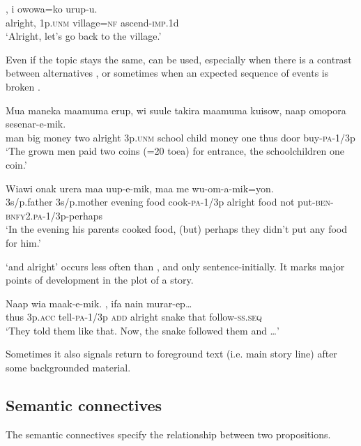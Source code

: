 \ea%
\label{ex:3:x720}
\gll {}, i owowa=ko urup-u. \\
alright, 1p.\textsc{unm} village=\textsc{nf} ascend-\textsc{imp}.1d\\
\glt`Alright, let's go back to the village.'
\z

Even if the topic stays the same,  can be used, especially when there is a contrast between alternatives , or sometimes when an expected sequence of events is broken .

\ea%
\label{ex:3:x719}
\gll Mua maneka maamuma erup,  wi suule takira maamuma kuisow, naap omopora sesenar-e-mik.\\
man big money two alright 3p.\textsc{unm} school child money one thus door buy-\textsc{pa}-1/3p\\
\glt`The grown men paid two coins (=20 toea) for entrance, the schoolchildren one coin.'
\z

\ea%
\label{ex:3:x722}
\gll Wiawi onak urera maa uup-e-mik,  maa me wu-om-a-mik=yon.\\
3s/p.father 3s/p.mother evening food cook-\textsc{pa}-1/3p alright food not put-\textsc{ben}-\textsc{bnfy}2.\textsc{pa}-1/3p-perhaps\\
\glt`In the evening his parents cooked food, (but) perhaps they didn't put any food for him.'
\z

 `and alright' occurs less often than , and only sentence-initially. It marks major points of development in the plot of a story. 

\ea%
\label{ex:3:x723}
\gll Naap wia maak-e-mik.  , ifa nain murar-ep{\dots} \\
thus 3p.\textsc{acc} tell-\textsc{pa}-1/3p \textsc{add} alright snake that follow-\textsc{ss}.\textsc{seq}\\
\glt`They told them like that. Now, the snake followed them and {\dots}'
\z

Sometimes it also signals return to foreground text (i.e. main story line) after some backgrounded material. 

\subsection{Semantic connectives}\label{sec:3.11.2}
{}
The semantic connectives specify the relationship between two propositions. 

